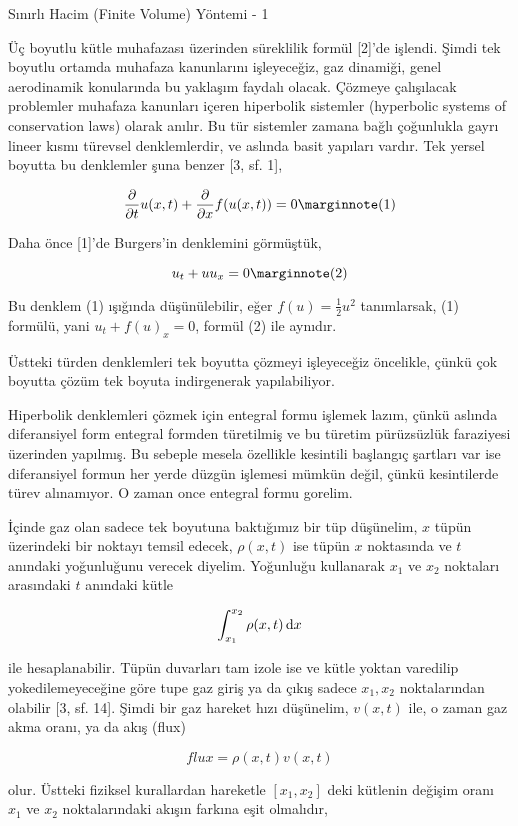\documentclass[12pt,fleqn]{article}\usepackage{../../common}
\begin{document}
Sınırlı Hacim (Finite Volume) Yöntemi - 1

Üç boyutlu kütle muhafazası üzerinden süreklilik formül [2]'de işlendi.  Şimdi
tek boyutlu ortamda muhafaza kanunlarını işleyeceğiz, gaz dinamiği, genel
aerodinamik konularında bu yaklaşım faydalı olacak. Çözmeye çalışılacak
problemler muhafaza kanunları içeren hiperbolik sistemler (hyperbolic systems of
conservation laws) olarak anılır. Bu tür sistemler zamana bağlı çoğunlukla gayrı
lineer kısmı türevsel denklemlerdir, ve aslında basit yapıları vardır. Tek
yersel boyutta bu denklemler şuna benzer [3, sf. 1],

$$
\frac{\partial }{\partial t} u(x,t) + 
\frac{\partial }{\partial x} f(u(x,t)) = 0
\mlabel{1}
$$

Daha önce [1]'de Burgers'in denklemini görmüştük, 

$$
u_t + uu_x = 0
\mlabel{2}
$$

Bu denklem (1) ışığında düşünülebilir, eğer $f(u) = \frac{1}{2}u^2$ tanımlarsak,
(1) formülü, yani $u_t + f(u)_x = 0$, formül (2) ile aynıdır.

Üstteki türden denklemleri tek boyutta çözmeyi işleyeceğiz öncelikle, çünkü çok
boyutta çözüm tek boyuta indirgenerak yapılabiliyor.

Hiperbolik denklemleri çözmek için entegral formu işlemek lazım, çünkü aslında
diferansiyel form entegral formden türetilmiş ve bu türetim pürüzsüzlük
faraziyesi üzerinden yapılmış. Bu sebeple mesela özellikle kesintili başlangıç
şartları var ise diferansiyel formun her yerde düzgün işlemesi mümkün değil,
çünkü kesintilerde türev alınamıyor. O zaman once entegral formu gorelim.

İçinde gaz olan sadece tek boyutuna baktığımız bir tüp düşünelim, $x$ tüpün
üzerindeki bir noktayı temsil edecek, $\rho(x,t)$ ise tüpün $x$ noktasında ve
$t$ anındaki yoğunluğunu verecek diyelim. Yoğunluğu kullanarak $x_1$ ve $x_2$
noktaları arasındaki $t$ anındaki kütle

$$
\int _{x_1}^{x_2} \rho(x,t) \,\mathrm{d} x
$$

ile hesaplanabilir. Tüpün duvarları tam izole ise ve kütle yoktan varedilip
yokedilemeyeceğine göre tupe gaz giriş ya da çıkış sadece $x_1,x_2$
noktalarından olabilir [3, sf. 14]. Şimdi bir gaz hareket hızı düşünelim,
$v(x,t)$ ile, o zaman gaz akma oranı, ya da akış (flux)

$$
flux = \rho(x,t) v(x,t)
$$

olur. Üstteki fiziksel kurallardan hareketle $[x_1,x_2]$ deki kütlenin
değişim oranı $x_1$ ve $x_2$ noktalarındaki akışın farkına eşit olmalıdır,
\end{document}
